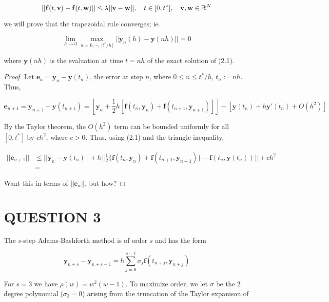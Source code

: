 \documentclass[a4paper]{article}
\begin{document}
\[ | | \mathbf{f}(t,\mathbf{v}) - \mathbf{f}(t,\mathbf{w}) | | \leq \lambda | |  \mathbf{v} - \mathbf{w} | |, \quad t \in [0,t^{*}], \quad \mathbf{v},\mathbf{w} \in \mathbb{R}^{N} \]

we will prove that the trapezoidal rule converges; ie. 

\[ \lim\limits_{h \to 0} \max_{n = 0,\cdots,\lfloor t^{*} / h \rfloor } | |  \mathbf{y}_{n}(h) - \mathbf{y}(nh)  | | = 0 \]

where $ \mathbf{y}(nh) $ is the evaluation at time $ t = nh $ of the exact solution of (2.1).




\begin{proof}
	Let $ \mathbf{e}_{n} = \mathbf{y}_{n} - \mathbf{y}(t_{n}) $, the error at step $ n $, where $ 0 \leq n \leq t^{*} / h $, $ t_{n} := n h $. Thus,
	
	\[ \mathbf{e}_{n+1} = \mathbf{y}_{n+1} - \mathbf{y}(t_{n+1}) = [  \mathbf{y}_{n} + \frac{1}{2} h [ \mathbf{f}(t_{n},\mathbf{y}_{n}) + \mathbf{f}(t_{n+1},\mathbf{y}_{n+1})  ] ] - [  \mathbf{y}(t_{n}) + h \mathbf{y}'(t_{n}) + O(h^{2}) ] \]
	
	By the Taylor theorem, the $ O(h^{2}) $ term can be bounded uniformly for all $ [0,t^{*}] $ by $ ch^{2} $, where $ c > 0 $. Thus, using (2.1) and the triangle inequality, 
	
	\begin{align*}
	| | \mathbf{e}_{n+1} | |  & \leq | | \mathbf{y}_{n} - \mathbf{y}(t_{n}) | | + h | | \frac{1}{2} \{ \mathbf{f}(t_{n},\mathbf{y}_{n}) + \mathbf{f}(t_{n+1},\mathbf{y}_{n+1}) \} - \mathbf{f}(t_{n},\mathbf{y}(t_{n})) | | + ch^{2} \\
	& = 
	\end{align*}
	
	Want this in terms of $ | | \mathbf{e}_{n} | | $, but how?
\end{proof}

\section{QUESTION 3}
The $ s $-step Adams-Bashforth method is of order $ s $ and has the form

\[ \mathbf{y}_{n+s} - \mathbf{y}_{n+s-1} = h \sum_{j=0}^{s-1} \sigma_{j} \mathbf{f}(t_{n+j},\mathbf{y}_{n+j}) \]

For $ s =3 $ we have  $ \rho(w) = w^{2}(w - 1) $.  To maximize order, we let $ \sigma $  be the $ 2 $ degree polynomial ($ \sigma_{3} = 0 $) arising from the truncation of the Taylor expanison of
\end{document}
